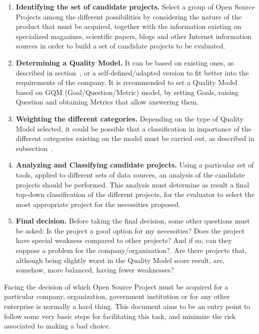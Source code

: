 \documentclass[11pt]{article}
\begin{document}
\begin{enumerate}
\item{\textbf{Identifying the set of candidate projects.}} Select a group of Open Source Projects among the different possibilities by considering the nature of the product that must be acquired, together with the information existing on specialized magazines, scientific papers, blogs and other Internet information sources in order to build a set of candidate projects to be evaluated.
\item{\textbf{Determining a Quality Model.}} It can be based on existing ones, as described in section~, or a self-defined/adapted version to fit better into the requirements of the company. It is recommended to set a Quality Model based on GQM (Goal/Question/Metric) model, by setting Goals, raising Question and obtaining Metrics that allow answering them.
\item{\textbf{Weighting the different categories.}} Depending on the type of Quality Model selected, it could be possible that a classification in importance of the different categories existing on the model must be carried out, as described in subsection~.
\item{\textbf{Analyzing and Classifying candidate projects.}} Using a particular set of tools, applied to different sets of data sources, an analysis of the candidate projects should be performed. This analysis must determine as result a final top-down classification of the different projects, for the evaluator to select the most appropriate project for the necessities proposed.
\item{\textbf{Final decision.}} Before taking the final decision, some other questions must be asked: Is the project a good option for my necessities? Does the project have special weakness compared to other projects? And if so, can they suppose a problem for the company/organization?. Are there projects that, although being slightly worst in the Quality Model score result, are, somehow, more balanced, having fewer weaknesses?
\end{enumerate}
Facing the decision of which Open Source Project must be acquired for a particular company, organization, government institution or for any other enterprise is normally a hard thing. This document aims to be an entry point to follow some very basic steps for facilitating this task, and minimize the risk associated to making a bad choice.

{}
\end{document}
